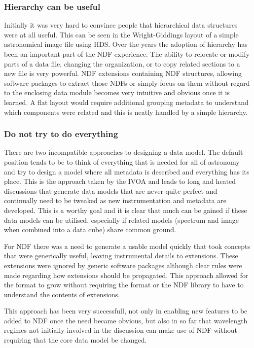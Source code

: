 \documentclass[final,authoryear,5p,times,twocolumn]{elsarticle}
\begin{document}
{\subsubsection{Hierarchy can be useful}

Initially it was very hard to convince people that hierarchical data
structures were at all useful. This can be seen in the Wright-Giddings
layout of a simple astronomical image file using HDS. Over the years
the adoption of hierarchy has been an important part of the NDF
experience. The ability to relocate or modify parts of a data file,
changing the organization, or to copy related sections to a new file
is very powerful.  NDF extensions containing NDF structures, allowing
software packages to extract those NDFs or simply focus on them
without regard to the enclosing data module becomes very intuitive and
obvious once it is learned. A flat layout would require additional
grouping metadata to understand which components were related and this
is neatly handled by a simple hierarchy.

\subsubsection{Do not try to do everything}

There are two incompatible approaches to designing a data model. The
default position tends to be to think of everything that is needed for
all of astronomy and try to design a model where all metadata is
described and everything has its place. This is the approach taken by
the IVOA \citep[see e.g.][]{2012arXiv1204.3055M} and leads to long and
heated discussions that generate data models that are never quite
perfect and continually need to be tweaked as new instrumentation and
metadata are developed. This is a worthy goal and it is clear that
much can be gained if these data models can be utilised, especially if
related models (spectrum and image when combined into a data cube)
share common ground.

For NDF there was a need to generate a usable model quickly that took
concepts that were generically useful, leaving instrumental details to
extensions. These extensions were ignored by generic software packages
although clear rules were made regarding how extensions should be
propagated. This approach allowed for the format to grow without
requiring the format or the NDF library to have to understand the
contents of extensions.

This approach has been very successfull, not only in enabling new
features to be added to NDF once the need became obvious, but also
in so far that wavelength regimes not initially involved in the
discussion can make use of NDF without requiring that the core data
model be changed.

}
\end{document}
